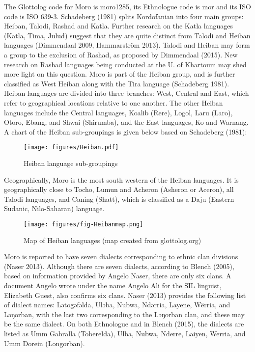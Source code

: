 The Glottolog code for Moro is moro1285, its Ethnologue code is mor and its ISO code is ISO 639-3.  Schadeberg (1981) splits Kordofanian into four main groups: Heiban, Talodi, Rashad and Katla. Further research on the Katla languages (Katla, Tima, Julud) suggest that they are quite distinct from Talodi and Heiban languages (Dimmendaal 2009, Hammarström 2013). Talodi and Heiban may form a group to the exclusion of Rashad, as proposed by Dimmendaal (2015). New research on Rashad languages being conducted at the U. of Khartoum may shed more light on this question. Moro is part of the Heiban group, and is further classified as West Heiban along with the Tira language (Schadeberg 1981). Heiban languages are divided into three branches: West, Central and East, which refer to geographical locations relative to one another. The other Heiban languages include the Central languages, Koalib (Rere), Logol, Laru (Laro), Otoro, Ebang, and Shwai (Shirumba), and the East languages, Ko and Warnang. A chart of the Heiban sub-groupings is given below based on Schadeberg (1981):

\begin{figure}
  \texttt{[image: figures/Heiban.pdf]}
    \caption{Heiban language sub-groupings}
  \label{fig:1-2}
\end{figure}


Geographically, Moro is the most south western of the Heiban languages. It is geographically close to Tocho, Lumun and Acheron (Asheron or Aceron), all Talodi languages, and Caning (Shatt), which is classified as a Daju (Eastern Sudanic, Nilo-Saharan) language. 

\begin{figure}
  \texttt{[image: figures/fig-Heibanmap.png]}
    \caption{Map of Heiban languages (map created from glottolog.org)}
  \label{fig:1-3}
\end{figure}

Moro is reported to have seven dialects corresponding to ethnic clan divisions (Naser 2013). Although there are seven dialects, according to Blench (2005), based on information provided by Angelo Naser, there are only six clans. A document Angelo wrote under the name Angelo Ali for the SIL linguist, Elizabeth Guest, also confirms six clans. Naser (2013) provides the following list of dialect names: Lətogəfəlda, Uləba, Nubwa, Ndərria, Layene, Wërria, and Ləŋorban, with the last two corresponding to the Ləŋorban clan, and these may be the same dialect. On both Ethnologue and in Blench (2015), the dialects are listed as Umm Gabralla (Toberelda), Ulba, Nubwa, Nderre, Laiyen, Werria, and Umm Dorein (Longorban). 


